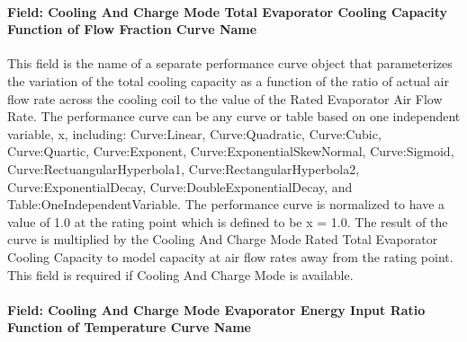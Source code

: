\paragraph{Field: Cooling And Charge Mode Total Evaporator Cooling Capacity Function of Flow Fraction Curve Name}\label{field-cooling-and-charge-mode-total-evaporator-cooling-capacity-function-of-flow-fraction-curve-name}

This field is the name of a separate performance curve object that parameterizes the variation of the total cooling capacity as a function of the ratio of actual air flow rate across the cooling coil to the value of the Rated Evaporator Air Flow Rate. The performance curve can be any curve or table based on one independent variable, x, including: Curve:Linear, Curve:Quadratic, Curve:Cubic, Curve:Quartic, Curve:Exponent, Curve:ExponentialSkewNormal, Curve:Sigmoid, Curve:RectuangularHyperbola1, Curve:RectangularHyperbola2, Curve:ExponentialDecay, Curve:DoubleExponentialDecay, and Table:OneIndependentVariable. The performance curve is normalized to have a value of 1.0 at the rating point which is defined to be x = 1.0. The result of the curve is multiplied by the Cooling And Charge Mode Rated Total Evaporator Cooling Capacity to model capacity at air flow rates away from the rating point. This field is required if Cooling And Charge Mode is available.

\paragraph{Field: Cooling And Charge Mode Evaporator Energy Input Ratio Function of Temperature Curve Name}\label{field-cooling-and-charge-mode-evaporator-energy-input-ratio-function-of-temperature-curve-name}

